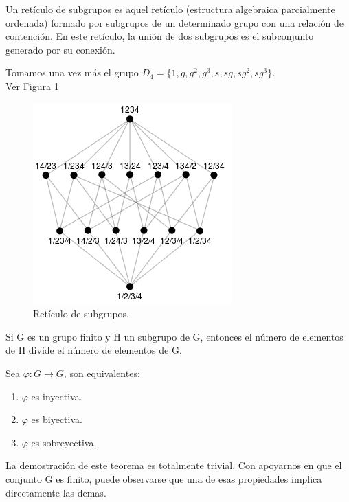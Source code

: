 \documentclass[a4paper,10pt]{apuntes}
\begin{document}
  \begin{defn}
   Un retículo de subgrupos es aquel retículo (estructura algebraica parcialmente ordenada) formado por subgrupos de un determinado grupo
   con una relación de contención. En este retículo, la unión de dos subgrupos es el subconjunto generado por su conexión.
  \end{defn}

  \begin{example}
   Tomamos una vez más el grupo $D_{4}=\{1,g,g^{2}, g^{3}, s, sg, sg^{2}, sg^{3}\}$.\\ Ver Figura \ref{Reticulo}\\
  \end{example}
  
   \begin{figure}[h]
   	\centering
	\includegraphics[scale=1]{Reticulo.jpg}   
	\caption{Retículo de subgrupos.}
	\label{Reticulo}
   \end{figure}

  \begin{theorem}
   Si G es un grupo finito y H un subgrupo de G, entonces el número de elementos de H divide el número de elementos de G.
  \end{theorem}
  \begin{lemma}
   Sea $\varphi: G\rightarrow G$, son equivalentes:
   \begin{enumerate}
    \item $\varphi$  es inyectiva.
    \item $\varphi$  es biyectiva.
    \item $\varphi$  es sobreyectiva.
   \end{enumerate}
  \end{lemma}
  La demostración de este teorema es totalmente trivial. Con apoyarnos en que el conjunto G es finito, puede observarse que una de
  esas propiedades implica directamente las demas.
  
\end{document}
